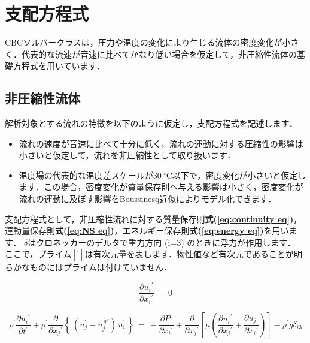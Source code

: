 
%
\section{支配方程式}
\label{sec:basic eqs}
CBCソルバークラスは，圧力や温度の変化により生じる流体の密度変化が小さく．代表的な流速が音速に比べてかなり低い場合を仮定して，非圧縮性流体の基礎方程式を用いています．

%
\subsection{非圧縮性流体}
解析対象とする流れの特徴を以下のように仮定し，支配方程式を記述します．

\begin{itemize}
\item 流れの速度が音速に比べて十分に低く，流れの運動に対する圧縮性の影響は小さいと仮定して，流れを非圧縮性として取り扱います．
\item 温度場の代表的な温度差スケールが$30\ {}^\circ\mathrm{C}$以下で，密度変化が小さいと仮定します．この場合，密度変化が質量保存則へ与える影響は小さく，密度変化が流れの運動に及ぼす影響をBoussinesq近似によりモデル化できます．
\end{itemize}

支配方程式として，非圧縮性流れに対する質量保存則\textbf{式(\ref{eq:continuity eq})}，運動量保存則\textbf{式(\ref{eq:NS eq})}，エネルギー保存則\textbf{式(\ref{eq:energy eq})}を用います．
$\delta$はクロネッカーのデルタで重力方向 (i=3) のときに浮力が作用します．
ここで，プライム$[{}^{\prime}]$は有次元量を表します．物性値など有次元であることが明らかなものにはプライムは付けていません．

\begin{equation}
\frac{ \partial{{u}_{i}}^{\prime} }{ \partial{{x}_{i}}^{\prime} }\,{=}\,{0}
\label{eq:continuity eq}
\end{equation}

\begin{equation}
\rho^{\prime} \frac{\partial{{u}_{i}}^{\prime}}{\partial{t}^{\prime}} + \rho^{\prime} \frac{\partial}{\partial{{x}_{j}}^{\prime}} \left \{ \,\left( u_j^\prime - u_j^{\,g\,\prime} \right) \,u_i^\prime\,\right \}
\,{=}\,
- \frac{\partial{P}^{\prime}}{\partial{{x}_{i}}^{\prime}} + \frac{\partial}{\partial{{x}_{j}}^{\prime}} \left[ {\mu\left({ \frac{\partial{{u}_{i}}^{\prime}}{\partial{{x}_{j}}^{\prime}} + \frac{\partial{{u}_{j}}^{\prime}}{\partial{{x}_{i}}^{\prime}}} \right)} \right] - \rho^{\prime} {g}{\delta}_{i3}
\label{eq:NS eq}
\end{equation}

